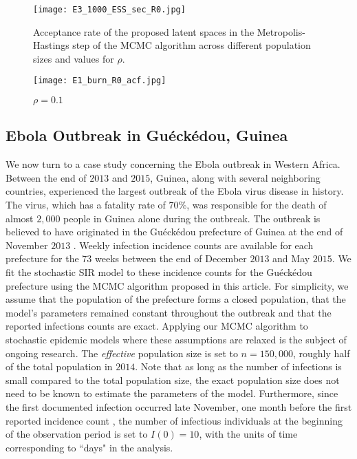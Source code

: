 \documentclass[11pt]{article}
\begin{document}
	\begin{figure}
		\centering
		\texttt{[image: E3\_1000\_ESS\_sec\_R0.jpg]}
		\caption{Acceptance rate of the proposed latent spaces in the Metropolis-Hastings step of the MCMC algorithm across different population sizes and values for $\rho$.}
		\label{fig:ESS_sec}
	\end{figure}			
				
							
	\begin{figure}
		\centering	
\centering
\texttt{[image: E1\_burn\_R0\_acf.jpg]}
\caption{$\rho = 0.1$}
\label{fig:acf}
	\end{figure}

		
	\subsection{Ebola Outbreak in Gu\'eck\'edou, Guinea}
	\label{sec:ebo}
	
	We now turn to a case study concerning the Ebola outbreak in Western Africa.
	Between the end of $2013$ and $2015$, Guinea, along with several neighboring countries, experienced the largest outbreak of the Ebola virus disease in history. The virus, which has a fatality rate of $70\%$, was responsible for the death of almost $2,000$ people in Guinea alone during the outbreak.
	The outbreak is believed to have originated in the Gu\'eck\'edou prefecture of Guinea at the end of November $2013$ \cite{Baize.2014}. Weekly infection incidence counts are available for each prefecture for the $73$ weeks between the end of December $2013$ and May $2015$.
	We fit the stochastic SIR model to these incidence counts for the Gu\'eck\'edou prefecture using the MCMC algorithm proposed in this article.
	For simplicity, we assume that the population of the prefecture forms a closed population, that the model's parameters remained constant throughout the outbreak and that the reported infections counts are exact. Applying our MCMC algorithm to stochastic epidemic models where these assumptions are relaxed is the subject of ongoing research.
	The \textit{effective} population size is set to $n = 150,000$, roughly half of the total population in $2014$. Note that as long as the number of infections is small compared to the total population size, the exact population size does not need to be known to estimate the parameters of the model. Furthermore, since the first documented infection occurred late November, one month before the first reported incidence count \cite{Baize.2014}, the number of infectious individuals at the beginning of the observation period is set to $I(0) = 10$, with the units of time corresponding to ``days" in the analysis.
		
\end{document}

